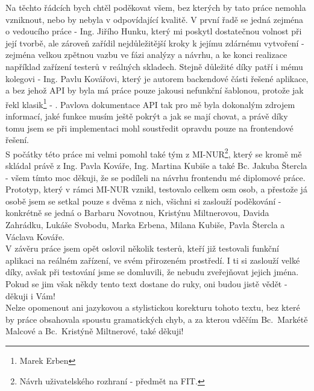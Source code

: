 Na těchto řádcích bych chtěl poděkovat všem, bez kterých by tato práce nemohla vzniknout, nebo by nebyla v odpovídající kvalitě. V první řadě se jedná zejména o vedoucího práce - Ing. Jiřího Hunku, který mi poskytl dostatečnou volnost při její tvorbě, ale zároveň zařídil nejdůležitější kroky k jejímu zdárnému vytvoření - zejména velkou zpětnou vazbu ve fázi analýzy a návrhu, a ke konci realizace například zařízení testerů v reálných skladech. Stejně důležité díky patří i mému kolegovi - Ing. Pavlu Kovářovi, který je autorem backendové části řešené aplikace, a bez jehož API by byla má práce pouze jakousi nefunkční šablonou, protože jak řekl klasik\footnote{Marek Erben} - . Pavlova dokumentace API tak pro mě byla dokonalým zdrojem informací, jaké funkce musím ještě pokrýt a jak se mají chovat, a právě díky tomu jsem se při implementaci mohl soustředit opravdu pouze na frontendové řešení.\\
S počátky této práce mi velmi pomohl také tým z MI-NUR\footnote{Návrh uživatelského rozhraní - předmět na FIT.}, který se kromě mě skládal právě z Ing. Pavla Kováře, Ing. Martina Kubiše a také Bc. Jakuba Štercla - všem tímto moc děkuji, že se podíleli na návrhu frontendu mé diplomové práce. Prototyp, který v rámci MI-NUR vznikl, testovalo celkem osm osob, a přestože já osobě jsem se setkal pouze s dvěma z nich, všichni si zaslouží poděkování - konkrétně se jedná o Barbaru Novotnou, Kristýnu Miltnerovou, Davida Zahrádku, Lukáše Svobodu, Marka Erbena, Milana Kubiše, Pavla Štercla a Václava Kováře.\\
V závěru práce jsem opět oslovil několik testerů, kteří již testovali funkční aplikaci na reálném zařízení, ve svém přirozeném prostředí. I ti si zaslouží velké díky, avšak při testování jsme se domluvili, že nebudu zveřejňovat jejich jména. Pokud se jim však někdy tento text dostane do ruky, oni budou jistě vědět - děkuji i Vám!\\
Nelze opomenout ani jazykovou a stylistickou korekturu tohoto textu, bez které by práce obsahovala spoustu gramatických chyb, a za kterou vděčím Bc.~Markétě Malcové a Bc.~Kristýně Miltnerové, také děkuji!
